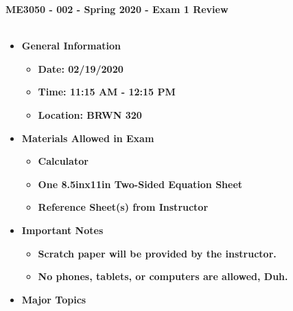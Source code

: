 \documentclass[11pt]{article}
\begin{document}
\textbf{ \LARGE ME3050 - 002 - Spring 2020 - Exam 1 Review  } \\\\

\begin{itemize}
	\item  \textbf{\Large General Information}\\

	\begin{itemize}

		\item  \textbf{\Large Date: 02/19/2020 }\\
		\item  \textbf{\Large Time: 11:15 AM - 12:15 PM }\\
		\item  \textbf{\Large Location: BRWN 320 }\\

	\end{itemize}

		\item  \textbf{\Large Materials Allowed in Exam}\\

	\begin{itemize}

		\item  \textbf{\Large Calculator}\\
		\item  \textbf{\Large One 8.5inx11in Two-Sided Equation Sheet }\\
		\item  \textbf{\Large Reference Sheet(s) from Instructor}\\

	\end{itemize}

\item  \textbf{\Large Important Notes}\\
	\begin{itemize}

		\item  \textbf{\Large Scratch paper will be provided by the instructor.}\\
		\item  \textbf{\Large No phones, tablets, or computers are allowed, Duh.}\\

	\end{itemize}

\item  \textbf{\Large Major Topics}\\
	\begin{itemize}



\end{itemize}
\end{itemize}
\end{document}
